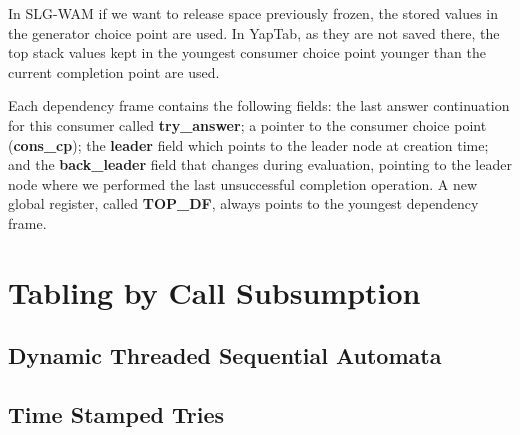  In SLG-WAM if we want to release space previously frozen, the stored values in the generator choice point are used. In
  YapTab, as they are not saved there, the top stack values kept in the youngest consumer choice point younger than
  the current completion point are used.
  
  Each dependency frame contains the following fields: the last answer continuation for this consumer called \textbf{try\_answer};
  a pointer to the consumer choice point (\textbf{cons\_cp}); the \textbf{leader} field which points to the leader node
  at creation time; and the \textbf{back\_leader} field that changes during evaluation, pointing to the leader node where we
  performed the last unsuccessful completion operation. 
  A new global register, called \textbf{TOP\_DF}, always points to the youngest dependency frame.
  
\section{Tabling by Call Subsumption} \label{sec:subsumption}
  \subsection{Dynamic Threaded Sequential Automata}
  \subsection{Time Stamped Tries} \label{sec:time_stamped_tries}
